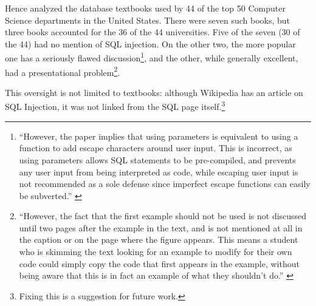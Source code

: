 \documentclass[conference]{IEEEtran}
\begin{document}
Hence \cite{Drop2019} analyzed the database textbooks used by  44 of the top 50 Computer Science
departments in the United States. %
There were seven such books, but three books accounted for the 36 of the 44 universities. Five of the seven (30 of the 44) had no mention of SQL injection. On the other two, the more popular one has a seriously flawed discussion\footnote{``However, the paper implies that using parameters is equivalent to using a function to add escape characters
around user input. This is incorrect, as using parameters allows
SQL statements to be pre-compiled, and prevents any user input
from being interpreted as code, while escaping user input is not
recommended as a sole defense since imperfect escape functions
can easily be subverted.'' \cite{Drop2019}}, and the other, while generally excellent, had a presentational problem\footnote{``However, the fact that the first
example should not be used is not discussed until two pages after
the example in the text, and is not mentioned at all in the caption or
on the page where the figure appears. This means a student who is
skimming the text looking for an example to modify for their own
code could simply copy the code that first appears in the example,
without being aware that this is in fact an example of what they
shouldn't do.'' \cite{Drop2019}}.
\par
This oversight is not limited to textbooks: although Wikipedia has an article on SQL Injection, it was not linked from the SQL page itself.\footnote{Fixing this is a suggestion for future work.}
\end{document}
